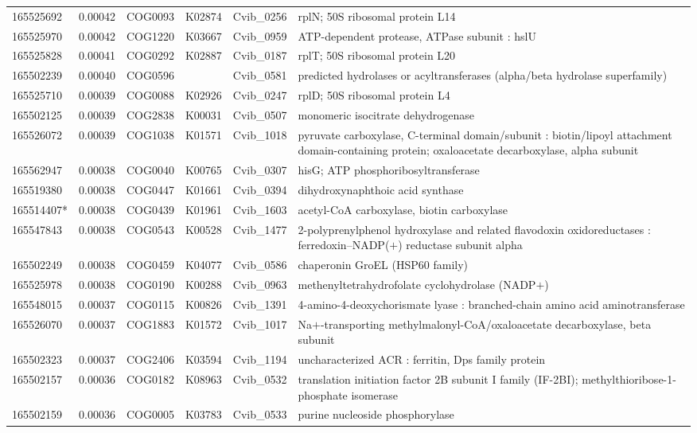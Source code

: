 \begin{landscape}
\begin{longtable}{p{1.8cm}p{0.9cm}p{2.2cm}p{1cm}p{2.8cm}p{13.4cm}}
165525692&0.00042&COG0093&K02874&Cvib\_0256&rplN; 50S ribosomal protein L14 \\
165525970&0.00042&COG1220&K03667&Cvib\_0959&ATP-dependent protease, ATPase subunit : hslU \\
165525828&0.00041&COG0292&K02887&Cvib\_0187&rplT; 50S ribosomal protein L20 \\
165502239&0.00040&COG0596&&Cvib\_0581&predicted hydrolases or acyltransferases (alpha/beta hydrolase superfamily) \\
165525710&0.00039&COG0088&K02926&Cvib\_0247&rplD; 50S ribosomal protein L4 \\
165502125&0.00039&COG2838&K00031&Cvib\_0507&monomeric isocitrate dehydrogenase \\
165526072&0.00039&COG1038&K01571&Cvib\_1018&pyruvate carboxylase, C-terminal domain/subunit : biotin/lipoyl attachment domain-containing protein; oxaloacetate decarboxylase, alpha subunit \\
165562947&0.00038&COG0040&K00765&Cvib\_0307&hisG; ATP phosphoribosyltransferase \\
165519380&0.00038&COG0447&K01661&Cvib\_0394&dihydroxynaphthoic acid synthase \\
165514407*&0.00038&COG0439&K01961&Cvib\_1603&acetyl-CoA carboxylase, biotin carboxylase \\
165547843&0.00038&COG0543&K00528&Cvib\_1477&2-polyprenylphenol hydroxylase and related flavodoxin oxidoreductases : ferredoxin--NADP($+$) reductase subunit alpha \\
165502249&0.00038&COG0459&K04077&Cvib\_0586&chaperonin GroEL (HSP60 family) \\
165525978&0.00038&COG0190&K00288&Cvib\_0963&methenyltetrahydrofolate cyclohydrolase (NADP$+$) \\
165548015&0.00037&COG0115&K00826&Cvib\_1391&4-amino-4-deoxychorismate lyase : branched-chain amino acid aminotransferase \\
165526070&0.00037&COG1883&K01572&Cvib\_1017&Na$+$-transporting methylmalonyl-CoA/oxaloacetate decarboxylase, beta subunit \\
165502323&0.00037&COG2406&K03594&Cvib\_1194&uncharacterized ACR : ferritin, Dps family protein \\
165502157&0.00036&COG0182&K08963&Cvib\_0532&translation initiation factor 2B subunit I family (IF-2BI); methylthioribose-1-phosphate isomerase \\
165502159&0.00036&COG0005&K03783&Cvib\_0533&purine nucleoside phosphorylase \\

\end{longtable}
\end{landscape}
